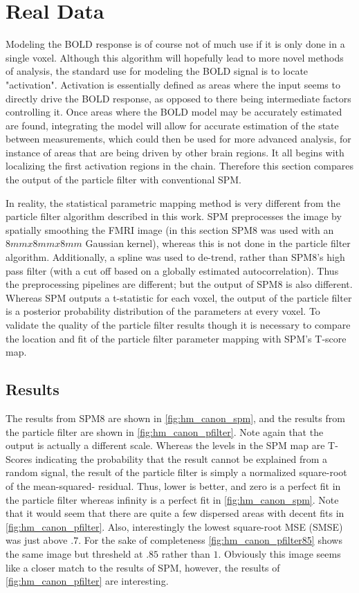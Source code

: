 \chapter{Real Data}
\label{sec:RealData}
Modeling the BOLD response is of course not of much use if it is only done in a 
single voxel. Although this algorithm will hopefully lead to more novel methods 
of analysis, the standard use for modeling the BOLD signal is to locate "activation".
Activation is essentially defined as areas where the input seems to directly drive
the BOLD response, as opposed to there being intermediate factors controlling it. 
Once areas where the BOLD 
model may be accurately estimated are found, integrating the model will allow for accurate
estimation of the state between measurements, which could then be used for more 
advanced analysis, for instance of areas that are being driven by other brain regions.
It all begins with localizing the first activation regions in the
chain. Therefore this section compares the output of the particle filter 
with conventional SPM. 

In reality, the statistical parametric mapping method is very different from the 
particle filter algorithm described in this work.
SPM preprocesses the image by spatially smoothing the FMRI image (in this section 
SPM8 was used with an $8mm x 8mm x 8mm$ Gaussian kernel), whereas
this is not done in the particle filter algorithm. Additionally, a spline
was used to de-trend, rather than SPM8's high pass filter (with a cut
off based on a globally estimated autocorrelation). Thus the preprocessing pipelines 
are different; but the output of SPM8 is also different. Whereas SPM outputs
a t-statistic for each voxel, the output 
of the particle filter is a posterior probability distribution of the parameters
at every voxel. To validate the quality of the particle filter results though
it is necessary to compare the location and fit of the particle filter parameter
mapping with SPM's T-score map. 

\section{Results}

The results from SPM8 are shown in \autoref{fig:hm_canon_spm}, and the results from 
the particle filter are shown in \autoref{fig:hm_canon_pfilter}. Note again that the
output is actually a different scale. Whereas the levels in the SPM map are T-Scores
indicating the probability that the result cannot be explained from a random signal,
the result of the particle filter is simply a normalized square-root of the mean-squared-
residual. Thus, lower is better, and zero is a perfect fit in the particle filter whereas
infinity is a perfect fit in \autoref{fig:hm_canon_spm}. Note that it would seem that there
are quite a few dispersed areas with decent fits in \autoref{fig:hm_canon_pfilter}. Also,
interestingly the lowest square-root MSE (SMSE) was just above $.7$. 
For the sake of completeness \autoref{fig:hm_canon_pfilter85} shows the same image but
thresheld at $.85$ rather than $1$. Obviously this image seems like a closer match to
the results of SPM, however, the results of \autoref{fig:hm_canon_pfilter} are interesting.


